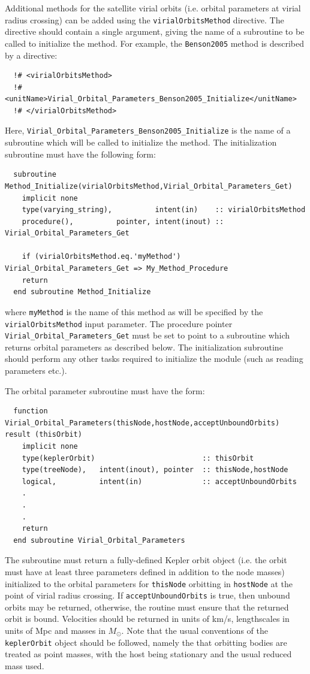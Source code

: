 Additional methods for the satellite virial orbits (i.e. orbital parameters at virial radius crossing) can be added using the {\tt virialOrbitsMethod} directive. The directive should contain a single argument, giving the name of a subroutine to be called to initialize the method. For example, the {\tt Benson2005} method is described by a directive:
\begin{verbatim}
  !# <virialOrbitsMethod>
  !#  <unitName>Virial_Orbital_Parameters_Benson2005_Initialize</unitName>
  !# </virialOrbitsMethod>
\end{verbatim}
Here, {\tt Virial\_Orbital\_Parameters\_Benson2005\_Initialize} is the name of a subroutine which will be called to initialize the method. The initialization subroutine must have the following form:
\begin{verbatim}
  subroutine Method_Initialize(virialOrbitsMethod,Virial_Orbital_Parameters_Get)
    implicit none
    type(varying_string),          intent(in)    :: virialOrbitsMethod
    procedure(),          pointer, intent(inout) :: Virial_Orbital_Parameters_Get
    
    if (virialOrbitsMethod.eq.'myMethod') Virial_Orbital_Parameters_Get => My_Method_Procedure
    return
  end subroutine Method_Initialize
\end{verbatim}
where {\tt myMethod} is the name of this method as will be specified by the {\tt virialOrbitsMethod} input parameter. The procedure pointer {\tt Virial\_Orbital\_Parameters\_Get} must be set to point to a subroutine which returns orbital parameters as described below. The initialization subroutine should perform any other tasks required to initialize the module (such as reading parameters etc.).

The orbital parameter subroutine must have the form:
\begin{verbatim}
  function Virial_Orbital_Parameters(thisNode,hostNode,acceptUnboundOrbits) result (thisOrbit)
    implicit none
    type(keplerOrbit)                         :: thisOrbit
    type(treeNode),   intent(inout), pointer  :: thisNode,hostNode
    logical,          intent(in)              :: acceptUnboundOrbits
    .
    .
    .
    return
  end subroutine Virial_Orbital_Parameters
\end{verbatim}
The subroutine must return a fully-defined Kepler orbit object (i.e. the orbit must have at least three parameters defined in addition to the node masses) initialized to the orbital parameters for {\tt thisNode} orbitting in {\tt hostNode} at the point of virial radius crossing. If {\tt acceptUnboundOrbits} is true, then unbound orbits may be returned, otherwise, the routine must ensure that the returned orbit is bound. Velocities should be returned in units of km/s, lengthscales in units of Mpc and masses in $M_\odot$. Note that the usual conventions of the {\tt keplerOrbit} object should be followed, namely the that orbitting bodies are treated as point masses, with the host being stationary and the usual reduced mass used.

